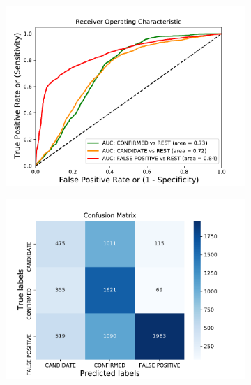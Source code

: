 \begin{figure}[H]
                \centering
                \begin{subfigure}{.49\textwidth}
                \includegraphics[width = 1\textwidth]{data/BernoulliNB_overfit_roc.pdf}
                \end{subfigure}
                \begin{subfigure}{.49\textwidth}
                \includegraphics[width = 1\textwidth]{data/BernoulliNB_overfit_cm.pdf}
                \end{subfigure}
                \begin{subfigure}{.49\textwidth}

\end{subfigure}
\end{figure}
